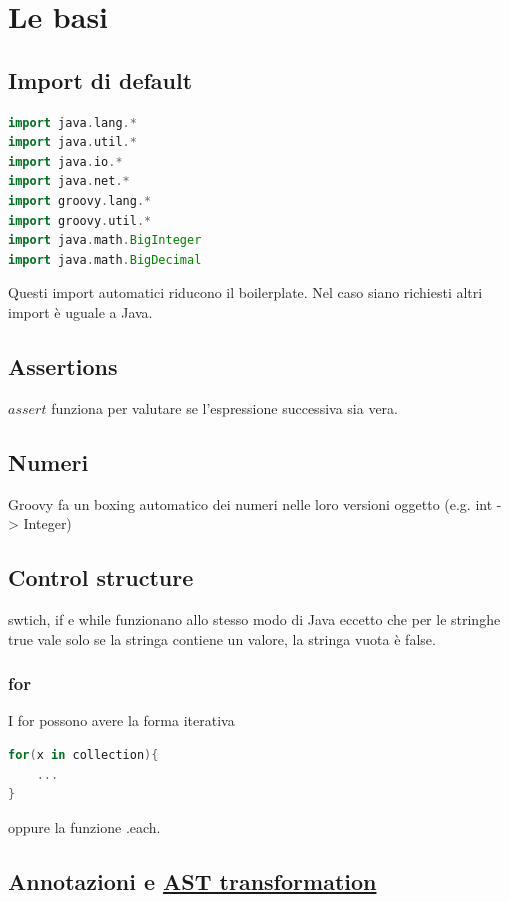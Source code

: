 \documentclass[11pt,a4paper]{book}
\begin{document}
\chapter{Le basi}
\section{Import di default}
\begin{lstlisting}[language = groovy]
import java.lang.*
import java.util.*
import java.io.*
import java.net.*
import groovy.lang.*
import groovy.util.*
import java.math.BigInteger
import java.math.BigDecimal
\end{lstlisting}
Questi import automatici riducono il boilerplate. Nel caso siano richiesti altri import è uguale a Java.

\section{Assertions}
$assert$ funziona per valutare se l'espressione successiva sia vera.

\section{Numeri}
Groovy fa un boxing automatico dei numeri nelle loro versioni oggetto (e.g. int -> Integer) 

\section{Control structure}
swtich, if e while funzionano allo stesso modo di Java eccetto che per le stringhe true vale solo se la stringa contiene un valore, la stringa vuota è false.

\subsection{for}
I for possono avere la forma iterativa
\begin{lstlisting}[language = groovy]
for(x in collection){
	...
}
\end{lstlisting}

oppure la funzione .each.

\section{Annotazioni e \href{http://docs.groovy-lang.org/next/html/gapi/groovy/transform/package-summary.html}{AST transformation}}
\end{document}

